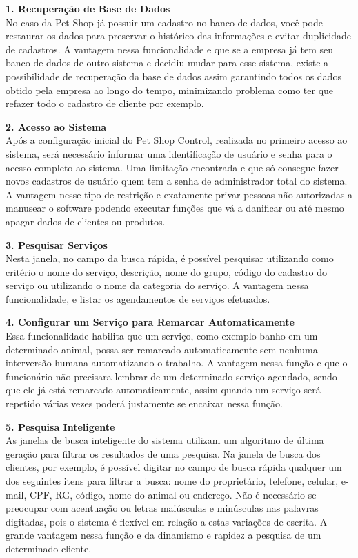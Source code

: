 \documentclass[12pt,openright,twoside,a4paper,english,french,spanish,brazil]{abntex2}
\begin{document}
\textbf{1.	{Recuperação de Base de Dados}}\\
No caso da Pet Shop já possuir um cadastro no banco de dados, você pode restaurar os dados para preservar o histórico das informações e evitar duplicidade de cadastros.
A vantagem nessa funcionalidade e que se a empresa já tem seu banco de dados de outro sistema e decidiu mudar para esse sistema, existe a possibilidade de recuperação da base de dados assim garantindo todos os dados obtido pela empresa ao longo do tempo, minimizando problema como ter que refazer todo o cadastro de cliente por exemplo.

\textbf{2.	{Acesso ao Sistema}}\\
Após a configuração inicial do Pet Shop Control, realizada no primeiro acesso ao sistema, será necessário informar uma identificação de usuário e senha para o acesso completo ao sistema. Uma limitação encontrada e que só consegue fazer novos cadastros de usuário quem tem a senha de administrador total do sistema. A vantagem nesse tipo de restrição e exatamente privar pessoas não autorizadas a manusear o software podendo executar funções que vá a danificar ou até mesmo apagar dados de clientes ou produtos.

\textbf{3.	Pesquisar Serviços}\\
Nesta janela, no campo da busca rápida, é possível pesquisar utilizando como critério o nome do serviço, descrição, nome do grupo, código do cadastro do serviço ou utilizando o nome da categoria do serviço. A vantagem nessa funcionalidade, e listar os agendamentos de serviços efetuados.

\textbf{4.	Configurar um Serviço para Remarcar Automaticamente}\\
Essa funcionalidade habilita que um serviço, como exemplo banho em um determinado animal, possa ser remarcado automaticamente sem nenhuma interversão humana automatizando o trabalho. A vantagem nessa função e que o funcionário não precisara lembrar de um determinado serviço agendado, sendo que ele já está remarcado automaticamente, assim quando um serviço será repetido várias vezes poderá justamente se encaixar nessa função.

\textbf{5.	Pesquisa Inteligente}\\
As janelas de busca inteligente do sistema utilizam um algoritmo de última geração para filtrar os resultados de uma pesquisa. Na janela de busca dos clientes, por exemplo, é possível digitar no campo de busca rápida qualquer um dos seguintes itens para filtrar a busca: nome do proprietário, telefone, celular, e-mail, CPF, RG, código, nome do animal ou endereço. Não é necessário se preocupar com acentuação ou letras maiúsculas e minúsculas nas palavras digitadas, pois o sistema é flexível em relação a estas variações de escrita. A grande vantagem nessa função e da dinamismo e rapidez a pesquisa de um determinado cliente.
\end{document}
